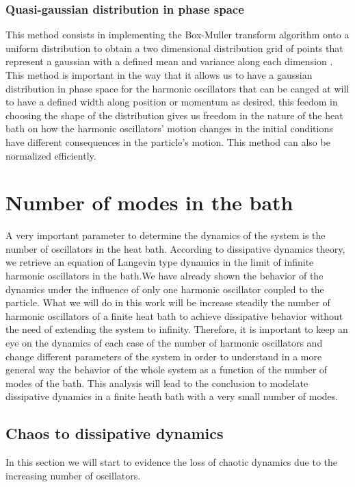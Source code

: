 \subsubsection{Quasi-gaussian distribution in phase space}
This method consists in implementing the Box-Muller transform algorithm onto a uniform distribution to obtain a two dimensional distribution grid of points that represent a gaussian with a defined mean and variance along each dimension \cite{box1958note}. This method is important in the way that it allows us to have a gaussian distribution in phase space for the harmonic oscillators that can be canged at will to have a defined width along position or momentum as desired, this feedom in choosing the shape of the distribution gives us freedom in the nature of the heat bath on how the harmonic oscillators' motion changes in the initial conditions have different consequences in the particle's motion. This method can also be normalized efficiently.





\section{Number of modes in the bath}
A very important parameter to determine the dynamics of the system is the number of oscillators in the heat bath. According to dissipative dynamics theory, we retrieve an equation of Langevin type dynamics in the limit of infinite harmonic oscillators in the bath.We have already shown the behavior of the dynamics under the influence of only one harmonic oscillator coupled to the particle. What we will do in this work will be increase steadily the number of harmonic oscillators of a finite heat bath to achieve dissipative behavior without the need of extending the system to infinity. Therefore, it is important to keep an eye on the dynamics of each case of the number of harmonic oscillators and change different parameters of the system in order to understand in a more general way the behavior of the whole system as a function of the number of modes of the bath. This analysis will lead to the conclusion to modelate dissipative dynamics in a finite heath bath with a very small number of modes.

\subsection{Chaos to dissipative dynamics}
In this section we will start to evidence the loss of chaotic dynamics due to the increasing number of oscillators. 



